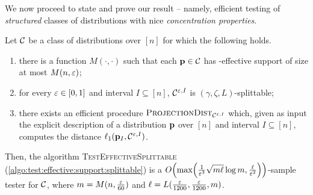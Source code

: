 We now proceed to state and prove our result -- namely, efficient testing of \emph{structured} classes of distributions with nice \emph{concentration properties}.
\begin{theorem}\label{theo:main:testing:effective:support}
  Let $\class$ be a class of distributions over $[n]$ for which the following holds.
    \begin{enumerate}
      \item there is a function $M(\cdot,\cdot)$ such that each $\D\in\class$ has \eps-effective support of size at most $M(n,\eps)$;
      \item for every $\eps \in [0,1]$ and interval $I\subseteq[n]$, $\class^{\eps,I}$ is $(\gamma,\zeta,L)$-splittable;
      \item there exists an efficient procedure $\estimdist[\class^{\eps,I}]$ which, given as input the explicit description of a distribution $\D$ over $[n]$ and interval $I\subseteq[n]$, computes the distance $\lp[1](\D_I,\class^{\eps,I})$.
    \end{enumerate}
    Then, the algorithm \textsc{TestEffectiveSplittable} (\cref{algo:test:effective:support:splittable}) is a $\bigO{ \max\mleft(\frac{1}{\eps^3} \sqrt{m\ell} \log m, \frac{\ell}{\eps^2}\mright) }$-sample tester for $\class$, where $m=M(n,\frac{\eps}{60})$ and $\ell=L(\frac{\eps}{1200},\frac{\eps}{1200}, m)$.
\end{theorem}

